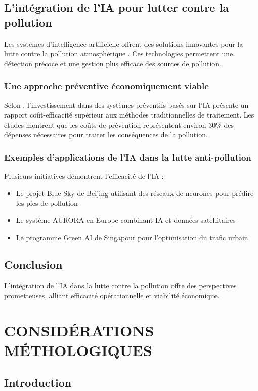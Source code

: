 \documentclass[12pt,a4paper]{report}
\begin{document}
\section{L'intégration de l'IA pour lutter contre la pollution}
Les systèmes d'intelligence artificielle offrent des solutions innovantes pour la lutte contre la pollution atmosphérique \cite{Chen2019}. Ces technologies permettent une détection précoce et une gestion plus efficace des sources de pollution.

\subsection{Une approche préventive économiquement viable}
Selon \cite{Wang2021}, l'investissement dans des systèmes préventifs basés sur l'IA présente un rapport coût-efficacité supérieur aux méthodes traditionnelles de traitement. Les études montrent que les coûts de prévention représentent environ 30\% des dépenses nécessaires pour traiter les conséquences de la pollution.

\subsection{Exemples d'applications de l'IA dans la lutte anti-pollution}
Plusieurs initiatives démontrent l'efficacité de l'IA :
\begin{itemize}
    \item Le projet Blue Sky de Beijing utilisant des réseaux de neurones pour prédire les pics de pollution \cite{Liu2020}
    \item Le système AURORA en Europe combinant IA et données satellitaires \cite{Kumar2021}
    \item Le programme Green AI de Singapour pour l'optimisation du trafic urbain \cite{Zhang2022}
\end{itemize}

\section{Conclusion}
L'intégration de l'IA dans la lutte contre la pollution offre des perspectives prometteuses, alliant efficacité opérationnelle et viabilité économique.
\chapter{CONSIDÉRATIONS MÉTHOLOGIQUES}
\section{Introduction}
\lipsum[1-2]
\end{document}
